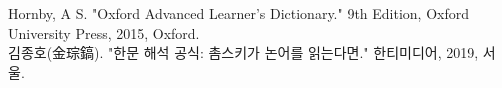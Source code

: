Hornby, A S. "Oxford Advanced Learner's Dictionary." 9th Edition, Oxford University Press, 2015, Oxford. \\
김종호(金琮鎬). "한문 해석 공식: 촘스키가 논어를 읽는다면." 한티미디어, 2019, 서울.
